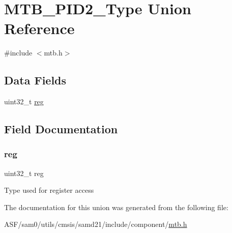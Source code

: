 \hypertarget{union_m_t_b___p_i_d2___type}{}\section{M\+T\+B\+\_\+\+P\+I\+D2\+\_\+\+Type Union Reference}
\label{union_m_t_b___p_i_d2___type}


{\ttfamily \#include $<$mtb.\+h$>$}

\subsection*{Data Fields}
\begin{DoxyCompactItemize}
\item 
uint32\+\_\+t \mbox{\hyperlink{union_m_t_b___p_i_d2___type_a6b91636401516a477989a336376d7b40}{reg}}
\end{DoxyCompactItemize}


\subsection{Field Documentation}
\mbox{\label{union_m_t_b___p_i_d2___type_a6b91636401516a477989a336376d7b40}} 
\subsubsection{\texorpdfstring{reg}{reg}}
{\footnotesize\ttfamily uint32\+\_\+t reg}

Type used for register access 

The documentation for this union was generated from the following file\+:\begin{DoxyCompactItemize}
\item 
A\+S\+F/sam0/utils/cmsis/samd21/include/component/\mbox{\hyperlink{component_2mtb_8h}{mtb.\+h}}\end{DoxyCompactItemize}
